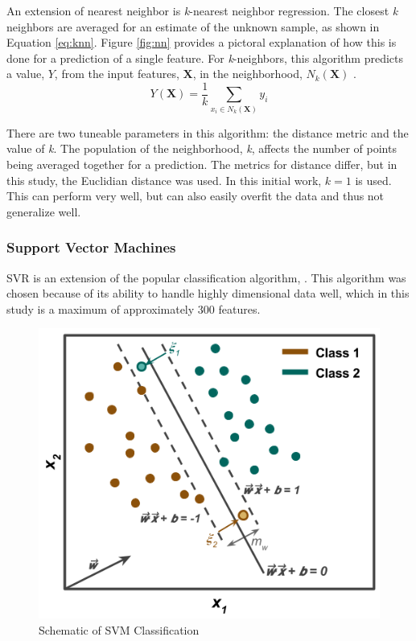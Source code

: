 An extension of nearest neighbor is \textit{k}-nearest neighbor regression.
The closest \textit{k} neighbors are averaged for an estimate of the unknown
sample, as shown in Equation \ref{eq:knn}.  Figure \ref{fig:nn} provides a
pictoral explanation of how this is done for a prediction of a single feature.
For \textit{k}-neighbors, this algorithm predicts a value, $Y$, from the input
features, $\boldsymbol{X}$, in the neighborhood, $N_k (\boldsymbol{X})$
\cite{elements_stats}. 
\begin{equation}
  Y(\boldsymbol{X}) = \frac{1}{k} \sum_{x_i \in N_k(\boldsymbol{X})} y_i
  \label{eq:knn}
\end{equation}

There are two tuneable parameters in this algorithm: the distance metric and
the value of \textit{k}.  The population of the neighborhood, \textit{k},
affects the number of points being averaged together for a prediction.  The
metrics for distance differ, but in this study, the Euclidian distance was
used. In this initial work, $k = 1$ is used. This can perform very well, but
can also easily overfit the data and thus not generalize well. 

\subsubsection{Support Vector Machines}
\label{sec:svm}

\Gls{SVR} is an extension of the popular classification algorithm,
.  This algorithm was chosen because of its ability to handle
highly dimensional data well, which in this study is a maximum of approximately
300 features. 

\begin{figure}[!htb]
  \centering
  \includegraphics[width=0.8\linewidth]{./chapters/litrev/svm.png}
  \caption{Schematic of \acrshort{SVM} Classification}
  \label{fig:svm}
\end{figure}

